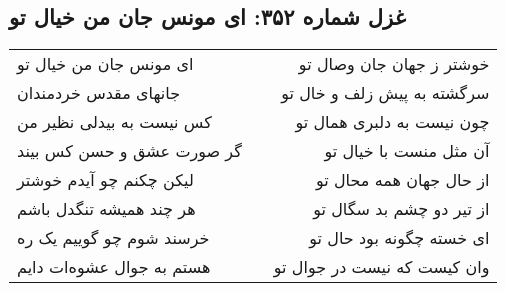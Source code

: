 \begin{center}
\section*{غزل شماره ۳۵۲: ای مونس جان من خیال تو}
\label{sec:352}
\begin{longtable}{l p{0.5cm} r}
ای مونس جان من خیال تو
&&
خوشتر ز جهان جان وصال تو
\\
جانهای مقدس خردمندان
&&
سرگشته به پیش زلف و خال تو
\\
کس نیست به بیدلی نظیر من
&&
چون نیست به دلبری همال تو
\\
گر صورت عشق و حسن کس بیند
&&
آن مثل منست با خیال تو
\\
لیکن چکنم چو آیدم خوشتر
&&
از حال جهان همه محال تو
\\
هر چند همیشه تنگدل باشم
&&
از تیر دو چشم بد سگال تو
\\
خرسند شوم چو گوییم یک ره
&&
ای خسته چگونه بود حال تو
\\
هستم به جوال عشوه‌ات دایم
&&
وان کیست که نیست در جوال تو
\\
\end{longtable}
\end{center}
